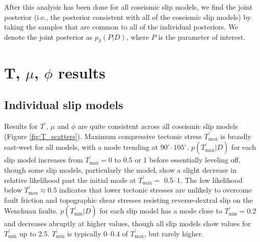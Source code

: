 \documentclass[draft,jgrga]{AGUTeX}
\begin{document}
\begin{article}
After this analysis has been done for all coseismic slip models, we find
the joint posterior (i.e., the posterior consistent with all of the
coseismic slip models) by taking the samples that are common to all of
the individual posteriors. We denote the joint posterior as
$p_{\mathrm{J}}(P | D)$, where $P$ is the parameter of interest.

\section{T, $\mu$, $\phi$ results}\label{t-mu-phi-results}

\subsection{Individual slip models}\label{individual-slip-models}

Results for $T^\prime$, $\mu$ and $\phi$ are quite consistent across all
coseismic slip models (Figure \ref{fig:T_scatters}). Maximum compressive
tectonic stress $T^\prime_{\mathrm{max}}$ is broadly east-west for all models,
with a mode trending at $90^{\circ}$--$105^{\circ}$.
$p(T^\prime_{\mathrm{max}}|D)$ for each slip model increases from
$T^\prime_{\mathrm{max}} = 0$ to 0.5 or 1 before essentially leveling off, though some
slip models, particularly the \citet{qi2011} model, show a
slight decrease in relative likelihood past the initial mode at
$T^\prime_{\mathrm{max}} =$ 0.5--1.
The low likelihood below $T^\prime_{\mathrm{max}} \approx 0.5$ indicates that lower
tectonic stresses are unlikely to overcome fault friction and
topographic shear stresses resisting reverse-dextral slip on the
Wenchuan faults. $p(T^\prime_{\mathrm{min}} | D)$ for each slip model
has a mode close to $T^\prime_{\mathrm{min}} = 0.2 $ and decreases
abruptly at higher values, though all slip models show values for
$T^\prime_{\mathrm{min}}$ up to 2.5. $T^\prime_{\mathrm{min}}$ is
typically 0--0.4 of $T^\prime_{\mathrm{max}}$, but rarely higher.



\end{article}
\end{document}
